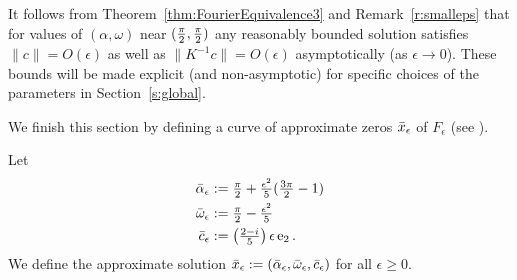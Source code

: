 \begin{remark}\label{r:cone}
It follows from Theorem~\ref{thm:FourierEquivalence3} and Remark~\ref{r:smalleps} that for values of $(\alpha,\omega)$ near $(\tfrac{\pi}{2},\tfrac{\pi}{2})$ any reasonably bounded solution satisfies $\| c\| =  O(\epsilon)$ as well as $\|K^{-1} c \| = O(\epsilon)$ asymptotically (as $\epsilon \to 0$).
These bounds will be made explicit (and non-asymptotic) for specific choices of the parameters in Section~\ref{s:global}.
\end{remark}











We finish this section by defining a curve of approximate zeros $\bar{x}_\epsilon$ of $F_\epsilon$ 
(see \cite{chow1977integral,hassard1981theory}). 


\begin{definition}\label{def:xepsilon}
Let
\begin{alignat*}{1}
	\bar{\alpha}_\epsilon &:= \tfrac{\pi}{2} + \tfrac{\epsilon^2}{5} ( \tfrac{3\pi}{2} -1)  \\
	\bar{\omega}_\epsilon &:= \tfrac{\pi}{2} -  \tfrac{\epsilon^2}{5} \\
	\bar{c}_\epsilon 	 &:= \left(\tfrac{2 - i}{5}\right) \epsilon \,  \mathrm{e}_2 \,.
\end{alignat*}
We define the approximate solution 
$ \bar{x}_\epsilon := \left( \bar{\alpha}_\epsilon , \bar{\omega}_\epsilon  , \bar{c}_\epsilon \right)$
for all $\epsilon \geq 0$.
\end{definition}

